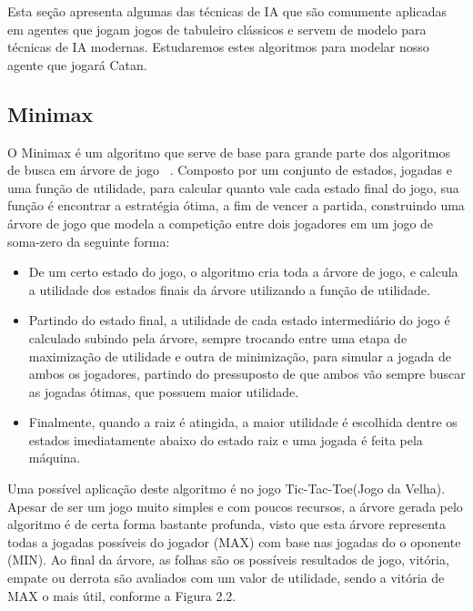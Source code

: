 Esta seção apresenta algumas das técnicas de IA que são comumente aplicadas em agentes que jogam jogos de tabuleiro clássicos e servem de modelo para técnicas de IA modernas. Estudaremos estes algoritmos para modelar nosso agente que jogará Catan.

\subsection{\label{sec:secao3.1}Minimax}

 

 O Minimax  é um algoritmo que serve de base para grande parte dos algoritmos de busca em árvore de jogo ~\cite{GOMINIMAX}. Composto por um conjunto de estados, jogadas e uma função de utilidade, para calcular quanto vale cada estado final do jogo, sua função é encontrar a estratégia ótima, a fim de vencer a partida, construindo uma árvore de jogo que modela a competição entre dois jogadores em um jogo de soma-zero da seguinte forma:
 
\begin{itemize}

   \item De um certo estado do jogo, o algoritmo cria toda a árvore de jogo, e calcula a utilidade dos estados finais da árvore utilizando a função de utilidade. 
   \item Partindo do estado final, a utilidade de cada estado intermediário do jogo é calculado subindo pela árvore, sempre trocando entre uma etapa de maximização de utilidade e outra de minimização, para simular a jogada de ambos os jogadores, partindo do pressuposto de que ambos vão sempre buscar as jogadas ótimas, que possuem maior utilidade.
   \item Finalmente, quando a raiz é atingida, a maior utilidade é escolhida dentre os estados imediatamente abaixo do estado raiz e uma jogada é feita pela máquina.
   
\end{itemize}
    
Uma possível aplicação deste algoritmo é no jogo Tic-Tac-Toe(Jogo da Velha). Apesar de ser um jogo muito simples e com poucos recursos, a árvore gerada pelo algoritmo é de certa forma bastante profunda, visto que esta árvore representa todas a jogadas possíveis do jogador (MAX) com base nas jogadas do o oponente (MIN). Ao final da árvore, as folhas são os possíveis resultados de jogo, vitória, empate ou derrota são avaliados com um valor de utilidade, sendo a vitória de MAX o mais útil, conforme a Figura 2.2.

